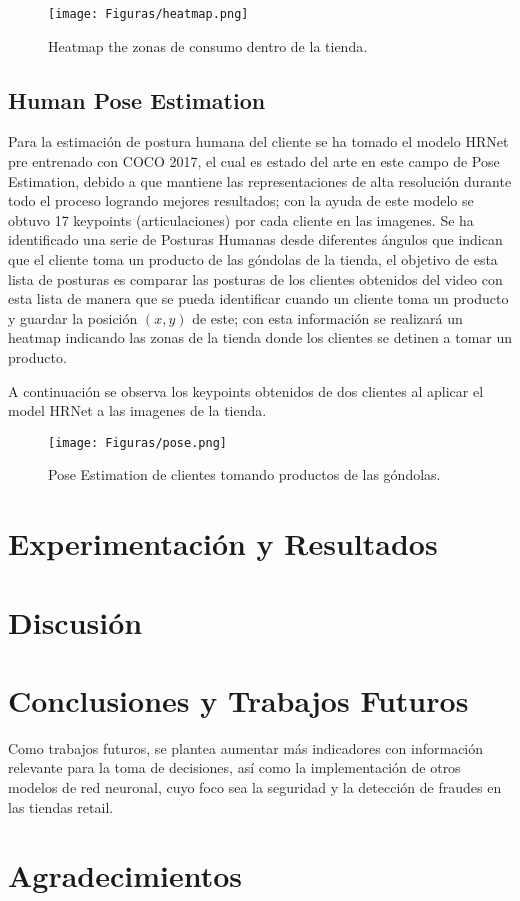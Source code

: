 \documentclass[conference]{IEEEtran}
\begin{document}
\begin{figure}[hbtp]
\centering
\texttt{[image: Figuras/heatmap.png]}
\caption{Heatmap the zonas de consumo dentro de la tienda.}
\label{fig:heatmap}
\end{figure}

\subsection{Human Pose Estimation}
Para la estimación de postura humana del cliente se ha tomado el modelo HRNet \cite{sun2019deep} pre entrenado con COCO 2017, el cual es estado del arte en este campo de Pose Estimation, debido a que mantiene las representaciones de alta resolución durante todo el proceso logrando mejores resultados; con la ayuda de este modelo se obtuvo 17 keypoints (articulaciones) por cada cliente en las imagenes.
Se ha identificado una serie de Posturas Humanas desde diferentes ángulos que indican que el cliente toma un producto de las góndolas de la tienda, el objetivo de esta lista de posturas es comparar las posturas de los clientes obtenidos del video con esta lista de manera que se pueda identificar cuando un cliente toma un producto y guardar la posición $(x, y)$ de este; con esta información se realizará un heatmap indicando las zonas de la tienda donde los clientes se detinen a tomar un producto.

A continuación se observa los keypoints obtenidos de dos clientes al aplicar el model HRNet a las imagenes de la tienda.

\begin{figure}[hbtp]
\centering
\texttt{[image: Figuras/pose.png]}
\caption{Pose Estimation de clientes tomando productos de las góndolas.}
\label{fig:pose}
\end{figure}


\section{Experimentación y Resultados}

\section{Discusión}

\section{Conclusiones y Trabajos Futuros}

Como trabajos futuros, se plantea aumentar más indicadores con información relevante para la toma de decisiones, así como la implementación de otros modelos de red neuronal, cuyo foco sea la seguridad y la detección de fraudes en las tiendas retail.

\section*{Agradecimientos}



\end{document}
